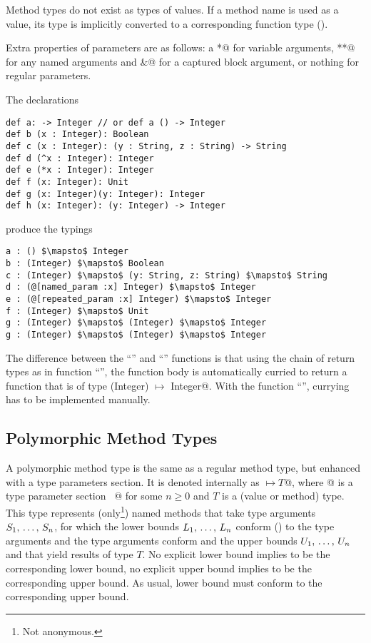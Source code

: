 Method types do not exist as types of values. If a method name is used as a value, its type is implicitly converted to a corresponding function type (). 

Extra properties of parameters are as follows: a \lstinline@*@ for variable arguments, \lstinline@**@ for any named arguments and \lstinline@&@ for a captured block argument, or nothing for regular parameters. 

\example The declarations
\begin{lstlisting}
def a: -> Integer // or def a () -> Integer
def b (x : Integer): Boolean
def c (x : Integer): (y : String, z : String) -> String
def d (^x : Integer): Integer
def e (*x : Integer): Integer
def f (x: Integer): Unit
def g (x: Integer)(y: Integer): Integer
def h (x: Integer): (y: Integer) -> Integer
\end{lstlisting}
produce the typings
\begin{lstlisting}
a : () $\mapsto$ Integer
b : (Integer) $\mapsto$ Boolean
c : (Integer) $\mapsto$ (y: String, z: String) $\mapsto$ String
d : (@[named_param :x] Integer) $\mapsto$ Integer
e : (@[repeated_param :x] Integer) $\mapsto$ Integer
f : (Integer) $\mapsto$ Unit
g : (Integer) $\mapsto$ (Integer) $\mapsto$ Integer
g : (Integer) $\mapsto$ (Integer) $\mapsto$ Integer
\end{lstlisting}

The difference between the ``'' and ``'' functions is that using the chain of return types as in function ``'', the function body is automatically curried to return a function that is of type \lstinline@(Integer) $\mapsto$ Integer@. With the function ``'', currying has to be implemented manually. 






\subsection{Polymorphic Method Types}
\label{sec:polymorphic-method-types}

A polymorphic method type is the same as a regular method type, but enhanced with a type parameters section. It is denoted internally as \lstinline@[$\tps$]$ \mapsto T$@, where \lstinline@[$\tps$]@ is a type parameter section ~\lstinline@[$\pm a_1$ >: $L_1$ <: $U_1$ $\commadots$ $\pm a_n$ >: $L_n$ <: $U_n$]@ for some $n \geq 0$ and $T$ is a (value or method) type. This type represents (only\footnote{Not anonymous.}) named methods that take type arguments $S_1 ,\, \ldots ,\, S_n$, for which the lower bounds $L_1 ,\, \ldots ,\, L_n$ conform () to the type arguments and the type arguments conform and the upper bounds $U_1 ,\, \ldots ,\, U_n$ and that yield results of type $T$. No explicit lower bound implies  to be the corresponding lower bound, no explicit upper bound implies  to be the corresponding upper bound. As usual, lower bound must conform to the corresponding upper bound. 

